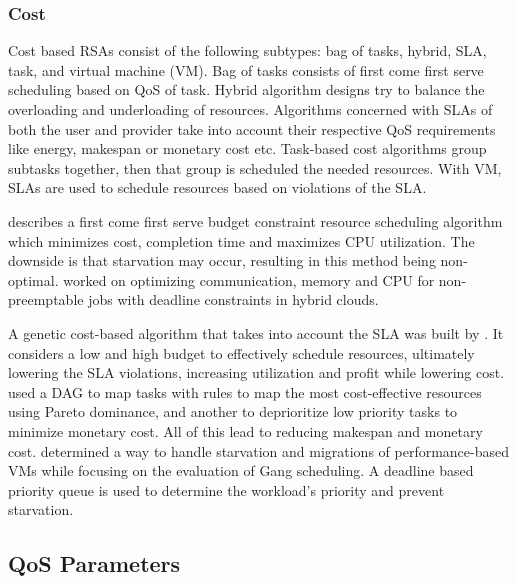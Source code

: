 \documentclass[12pt]{article}
\begin{document}
\subsubsection{Cost} \label{ssub:algCost}

Cost based RSAs consist of the following subtypes: bag of tasks, hybrid, SLA, task, and virtual machine (VM).
Bag of tasks consists of first come first serve scheduling based on QoS of task.
Hybrid algorithm designs try to balance the overloading and underloading of resources.
Algorithms concerned with SLAs of both the user and provider take into account their respective QoS requirements like energy, makespan or monetary cost etc.
Task-based cost algorithms group subtasks together, then that group is scheduled the needed resources.
With VM, SLAs are used to schedule resources based on violations of the SLA.

\textcite{ana2010} describes a first come first serve budget constraint resource scheduling algorithm which minimizes cost, completion time and maximizes CPU utilization. The downside is that starvation may occur, resulting in this  method being non-optimal.
\textcite{van2010cost} worked on optimizing communication, memory and CPU for non-preemptable jobs with deadline constraints in hybrid clouds.

A genetic cost-based algorithm that takes into account the SLA was built by \textcite{liu2013cost}. It considers a low and high budget to effectively schedule resources, ultimately lowering the SLA violations, increasing utilization and profit while lowering cost.
\textcite{su2013cost} used a DAG to map tasks with rules to map the most cost-effective resources using Pareto dominance, and another to deprioritize low priority tasks to minimize monetary cost. All of this lead to reducing makespan and monetary cost.
\textcite{ioannis2011cost} determined a way to handle starvation and migrations of performance-based VMs while focusing on the evaluation of Gang scheduling. A deadline based priority queue is used to determine the workload's priority and prevent starvation.



\subsection{QoS Parameters} \label{sub:schedQosParams}
\end{document}
